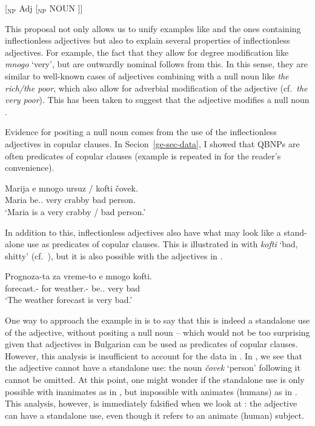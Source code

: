 \documentclass[output=paper]{langscibook}
\begin{document}
\ea \label{ge-br-bg-predSC}
[$_\text{NP}$ Adj [$_\text{NP}$ NOUN ]]
\z 

\noindent This proposal not only allows us to unify examples like  and the ones containing inflectionless adjectives but also to explain several properties of inflectionless adjectives. For example, the fact that they allow for degree modification like \emph{mnogo} `very', but are outwardly nominal follows from this. In this sense, they are similar to well-known cases of adjectives combining with a null noun like %
\emph{the rich/the poor}, which also allow for adverbial modification of the adjective (cf.\ \emph{the very poor}). This has been taken to suggest that the adjective modifies a null noun \citep[see][]{Kester1996,GiannakidouStavro1999}. 

Evidence for positing a null noun comes from the use of the inflectionless adjectives in copular clauses. In Secion~\ref{ge-sec-data}, I showed that QBNPs are often predicates of copular clauses (example  is repeated in  for the reader's convenience).

\ea \label{ge-ex-predx2}
\gll  Marija e mnogo ursuz / kofti \v{c}ovek.\\
Maria be.\Prs{}.\Tsg{} very crabby \phantom{/} bad person.\M{}\\
\glt `Maria is a very crabby / bad person.'
\z

\noindent In addition to this, inflectionless adjectives also have what may look like a stand-alone use as predicates of copular clauses. This is illustrated in  with \emph{kofti} `bad, shitty' (cf.\ ), but it is also possible with the adjectives in .

\ea \label{ge-ex-pred2inan}
\gll Prognoza-ta za vreme-to e mnogo kofti.\\
forecast.\F{}-\Def{} for weather.\N{}-\Def{} be.\Prs{}.\Tsg{} very bad\\
\glt `The weather forecast is very bad.'
\z

\noindent One way to approach the example in  is to say that this is indeed a standalone use of the adjective, without positing a null noun -- which would not be too surprising given that adjectives in Bulgarian can be used as predicates of copular clauses. However, this analysis is insufficient to account for the data in . In , we see that the adjective cannot have a standalone use: the noun \emph{\v{c}ovek} `person' following it cannot be omitted. At this point, one might wonder if the standalone use is only possible with inanimates as in , but impossible with animates (humans) as in . This analysis, however, is immediately falsified when we look at : the adjective can have a standalone use, even though it refers to an animate (human) subject. 
\end{document}
